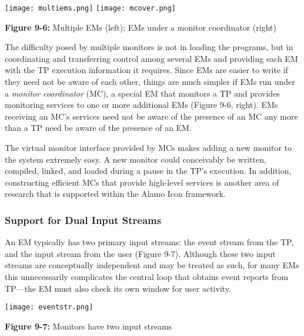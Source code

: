 \begin{center}
\texttt{[image: multiems.png]}
\hspace{1cm}
\texttt{[image: mcover.png]}
\end{center}

{\sffamily\bfseries Figure 9-6:}
{\sffamily Multiple EMs (left); EMs under a monitor coordinator (right)}

\bigskip

The difficulty posed by multiple monitors is not in loading the
programs, but in coordinating and transferring control among several
EMs and providing each EM with the TP execution information it
requires.  Since EMs are easier to write if they need not be aware of
each other, things are much simpler if EMs run under a
{\em monitor coordinator\/} (MC), a special EM that monitors a TP and
provides monitoring services
to one or more additional EMs (Figure 9-6, right).  EMs receiving an MC's
services need not be aware of the presence of an MC any more than a TP
need be aware of the presence of an EM.

The virtual monitor interface provided by MCs makes adding a new monitor to
the system extremely easy.  A new monitor could conceivably be written,
compiled, linked, and loaded during a pause in the TP's execution. In
addition, constructing efficient MCs that provide high-level services is
another area of research that is supported within the Alamo Icon framework.

\subsubsection*{Support for Dual Input Streams}

An EM typically has two primary input streams: the event stream from
the TP, and the input stream from the user (Figure 9-7).  Although
these two input streams are conceptually independent and may be
treated as such, for many EMs this unnecessarily complicates
the central loop that obtains event reports from TP---the EM must
also check its own window for user activity.

\begin{center}
\texttt{[image: eventstr.png]}
\end{center}

{\sffamily\bfseries Figure 9-7:}
{\sffamily Monitors have two input streams}


